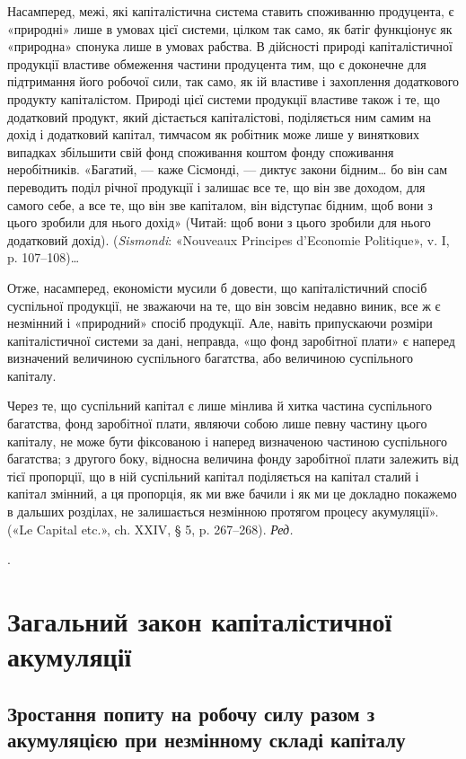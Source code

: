 {Насамперед, межі, які капіталістична система ставить споживанню
продуцента, є «природні» лише в умовах цієї системи, цілком так
само, як батіг функціонує як «природна» спонука лише в умовах рабства.
В дійсності природі капіталістичної продукції властиве обмеження
частини продуцента тим, що є доконечне для підтримання його робочої
сили, так само, як ій властиве і захоплення додаткового продукту
капіталістом. Природі цієї системи продукції властиве також і те, що
додатковий продукт, який дістається капіталістові, поділяється ним
самим на дохід і додатковий капітал, тимчасом як робітник може лише
у виняткових випадках збільшити свій фонд споживання коштом фонду
споживання неробітників. «Багатий, — каже Сісмонді, — диктує закони
бідним\dots{} бо він сам переводить поділ річної продукції і залишає все
те, що він зве доходом, для самого себе, а все те, що він зве капіталом,
він відступає бідним, щоб вони з цього зробили для нього дохід» (Читай:
щоб вони з цього зробили для нього додатковий дохід). (\emph{Sismondi}: «Nouveaux
Principes d’Economie Politique», v. I, p. 107--108)\dots{}

Отже, насамперед, економісти мусили б довести, що капіталістичний
спосіб суспільної продукції, не зважаючи на те, що він зовсім
недавно виник, все ж є незмінний і «природний» спосіб продукції. Але,
навіть припускаючи розміри капіталістичної системи за дані, неправда,
«що фонд заробітної плати» є наперед визначений величиною суспільного
багатства, або величиною суспільного капіталу.

Через те, що суспільний капітал є лише мінлива й хитка частина
суспільного багатства, фонд заробітної плати, являючи собою лише
певну частину цього капіталу, не може бути фіксованою і наперед визначеною
частиною суспільного багатства; з другого боку, відносна величина
фонду заробітної плати залежить від тієї пропорції, що в ній суспільний
капітал поділяється на капітал сталий і капітал змінний, а ця
пропорція, як ми вже бачили і як ми це докладно покажемо в дальших
розділах, не залишається незмінною протягом процесу акумуляції».
(«Le Capital etc.», ch. XXIV, § 5, p. 267--268). \emph{Ред.}
}.


\section{Загальний закон капіталістичної акумуляції}

\subsection{Зростання попиту на робочу силу разом з акумуляцією
при незмінному складі капіталу}

